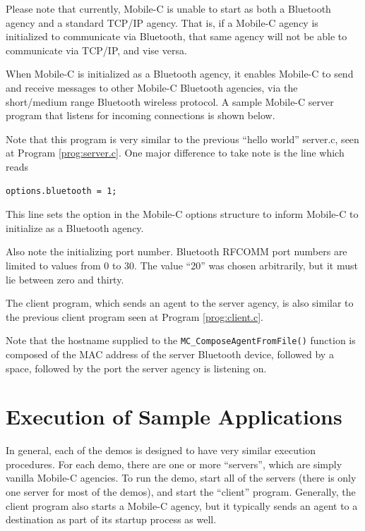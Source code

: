 \documentclass[11pt]{report}
\begin{document}
Please note that currently, Mobile-C is unable to start as both a Bluetooth
agency and a standard TCP/IP agency. That is, if a Mobile-C agency is
initialized to communicate via Bluetooth, that same agency will not be able to
communicate via TCP/IP, and vise versa. 

When Mobile-C is initialized as a Bluetooth agency, it enables Mobile-C to
send and receive messages to other Mobile-C Bluetooth agencies, via the
short/medium range Bluetooth wireless protocol. A sample Mobile-C 
server program that listens for incoming connections is shown below.

{\footnotesize \linespread{1.0} }

Note that this program is very similar to the previous ``hello world''
server.c, seen at Program \ref{prog:server.c}. One major difference to take
note is the line which reads

\begin{verbatim}
options.bluetooth = 1;
\end{verbatim}

This line sets the option in the Mobile-C options structure to inform Mobile-C
to initialize as a Bluetooth agency.

Also note the initializing port number. Bluetooth RFCOMM port numbers are
limited to values from 0 to 30. The value  ``20'' was chosen arbitrarily, but
it must lie between zero and thirty. 

The client program, which sends an agent to the server agency, is also similar
to the previous client program seen at Program \ref{prog:client.c}.

{\footnotesize \linespread{1.0} }

Note that the hostname supplied to the \texttt{MC\_ComposeAgentFromFile()}
function is composed of the MAC address of the server Bluetooth device,
followed by a space, followed by the port the server agency is listening on.


\section{Execution of Sample Applications}
In general, each of the demos is designed to have very similar execution
procedures. For each demo, there are one or more ``servers'', which are
simply vanilla Mobile-C agencies. To run the demo, start all of the servers
(there is only one server for most of the demos), and start the ``client''
program. Generally, the client program also starts a Mobile-C agency,
but it typically sends an agent to a destination as part of its startup
process as well.
\end{document}
